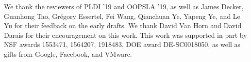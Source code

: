 \documentclass[acmsmall, screen]{acmart}\settopmatter{}
\begin{document}










\begin{acks}                            %
  We thank the reviewers of PLDI '19 and OOPSLA '19, as well as James Decker,
  Guanhong Tao, Gr\'egory Essertel, Fei Wang, Qianchuan Ye, Yapeng Ye, and Le Yu
  for their feedback on the early drafts. We thank David Van Horn and David
  Darais for their encouragement on this work.
  This work was supported in part by NSF awards 1553471, 1564207, 1918483, DOE
  award DE-SC0018050, as well as gifts from Google, Facebook, and VMware.
  
  \iffalse
  This material is based upon work supported by the
  \grantsponsor{GS100000001}{National Science
    Foundation}{http://dx.doi.org/10.13039/100000001} under Grant
  No.~\grantnum{GS100000001}{nnnnnnn} and Grant
  No.~\grantnum{GS100000001}{mmmmmmm}.  Any opinions, findings, and
  conclusions or recommendations expressed in this material are those
  of the author and do not necessarily reflect the views of the
  National Science Foundation.
  \fi
\end{acks}




\end{document}
